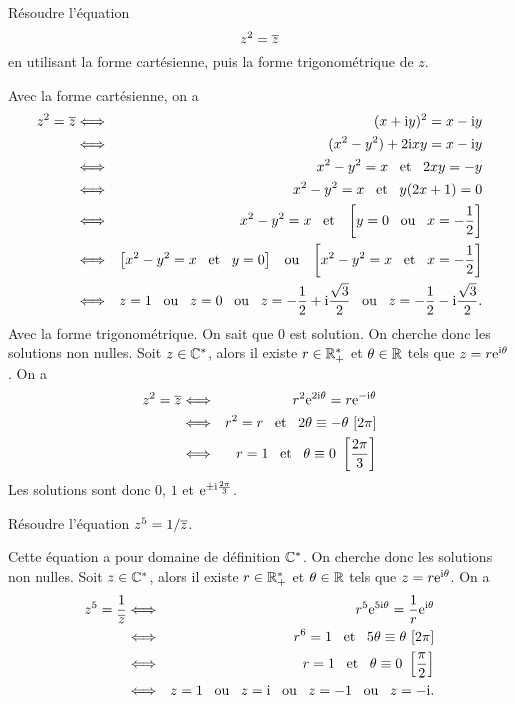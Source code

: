 \documentclass{magnoliaold}
\begin{document}
\begin{exos}
\exo Résoudre l'équation
  \[z^2=\overline{z}\]
  en utilisant la forme cartésienne, puis la forme trigonométrique de $z$.
  \begin{sol}
Avec la forme cartésienne, on a
\begin{eqnarray*}
z^2=\conj{z}
&\ssi& (x+\ii y)^2=x-\ii y\\
&\ssi& (x^2-y^2)+2\ii x y=x-\ii y\\
&\ssi& x^2-y^2=x \et 2xy=-y\\
&\ssi& x^2-y^2=x \et y(2x+1)=0\\
&\ssi& x^2-y^2=x \et \cro{y=0 \ou x=-\frac{1}{2}}\\
&\ssi& \cro{x^2-y^2=x \et y=0} \ou \cro{x^2-y^2=x \et x=-\frac{1}{2}}\\
&\ssi& z=1 \ou z=0 \ou z=-\frac{1}{2}+\ii\frac{\sqrt{3}}{2} \ou z=-\frac{1}{2}-\ii\frac{\sqrt{3}}{2}.
\end{eqnarray*}
  Avec la forme trigonométrique. On sait que 0 est solution. On cherche donc les solutions non nulles. Soit $z\in\mathbb{C}^*$, alors il existe $r\in\mathbb{R}_+^*$ et $\theta\in\mathbb{R}$ tels que $z=r{\rm e}^{{\rm i}\theta}$. On a
\begin{eqnarray*}
z^2=\overline{z}
&\Longleftrightarrow& r^2 {\rm e}^{2{\rm i}\theta} = r {\rm e}^{-{\rm i}\theta}\\
&\Longleftrightarrow& r^2=r \quad\!\text{et}\quad\! 2\theta\equiv -\theta\ [2\pi]\\
&\Longleftrightarrow& r=1 \quad\!\text{et}\quad\! \theta\equiv 0\ \left[\frac{2\pi}{3}\right]\\
\end{eqnarray*}
Les solutions sont donc $0$, $1$ et ${\rm e}^{\pm{\rm i}\frac{2\pi}{3}}$.
  \end{sol}
\exo Résoudre l'équation $z^5=1/\overline{z}$.
\begin{sol}
Cette équation a pour domaine de définition $\mathbb{C}^*$. On cherche donc les solutions non nulles. Soit $z\in\mathbb{C}^*$, alors il existe $r\in\mathbb{R}_+^*$ et $\theta\in\mathbb{R}$ tels que $z=r{\rm e}^{{\rm i}\theta}$. On a
\begin{eqnarray*}
z^5=\frac{1}{\conj{z}}
&\ssi& r^5 \e^{5\ii\theta} = \frac{1}{r} \e^{\ii\theta}\\
&\ssi& r^6=1 \et 5\theta\equiv \theta\ [2\pi]\\
&\ssi& r=1 \et \theta\equiv 0\ \cro{\frac{\pi}{2}}\\
&\ssi& z=1 \ou z=\ii \ou z=-1 \ou z=-\ii.
\end{eqnarray*}
  \end{sol}
\end{exos}
\end{document}
